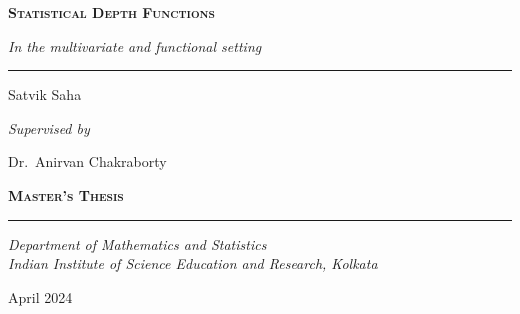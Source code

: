 \begin{titlepage}
    \vspace*{4cm}


    {\noindent\Huge\scshape\bfseries%
        Statistical Depth Functions
    }
    \vspace{0.5cm}

    {\noindent\LARGE\itshape
        In the multivariate and functional setting
    }
    \vspace{0.8cm}
    \hrule
    \vspace{0.8cm}

    {\noindent\Large Satvik Saha}
    \vspace{0.6cm}

    {\noindent\Large\itshape Supervised by}
    \vspace{0.1cm}

    {\noindent\Large Dr.~Anirvan Chakraborty}
    \vspace{0.5cm}

    \vfill

    \raggedleft
    {\noindent\Large\scshape\bfseries%
        Master's Thesis
    }

    \rule{0.5\textwidth}{1pt}

    \vspace{0.2cm}

    {\noindent\large\itshape
        Department of Mathematics and Statistics \\
        Indian Institute of Science Education and Research, Kolkata \\
    }
    \vspace{0.8cm}

    {\noindent\large April 2024}

    \vspace*{1cm}
\end{titlepage}
